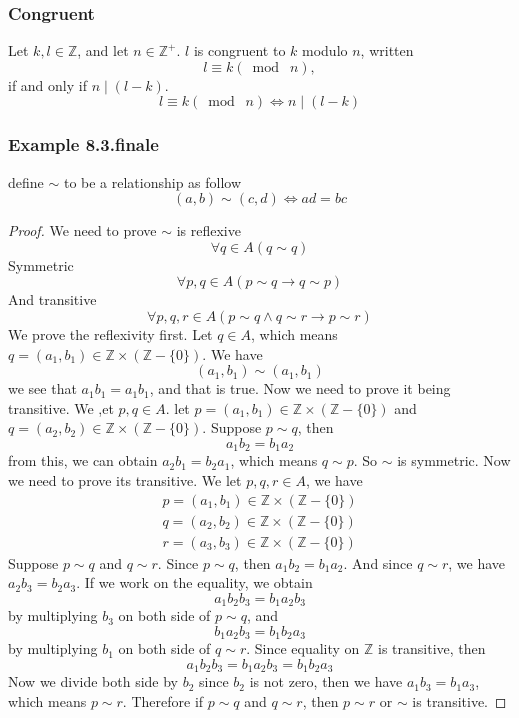 \documentclass[12pt]{book}
\newcommand{\Z}{\mathbb{Z}}
\newcommand{\paren}[1]{\left( #1 \right)}
\newcommand{\zero}{\{0\}}
\newcommand{\then}{\rightarrow}
\begin{document}
\subsubsection{Congruent}
Let $k,l \in \Z$, and let $n \in \Z^+$. $l$ is congruent to $k$ modulo $n$, written 
\[
l \equiv k (\bmod \; n),
\]
if and only if $n \mid (l-k)$.
\[
l \equiv k (\bmod \; n) \iff n \mid (l-k)
\]

\subsubsection{Example 8.3.finale}

define $\sim$ to be a relationship as follow
\[
(a,b) \sim (c,d) \iff ad=bc
\]

\begin{proof}
    We need to prove $\sim$ is reflexive
    \[
    \forall q \in A (q \sim q)
    \]
    Symmetric
    \[
    \forall p,q \in A( p \sim q \then q \sim p)
    \]
    And transitive
    \[
    \forall p,q,r \in A ( p\sim q \wedge q\sim r \then p \sim r)
    \]
    We prove the reflexivity first. Let $q \in A$, which means $q = (a_1,b_1)\in \Z \times \paren{\Z - \zero}$. We have
    \[
    (a_1,b_1) \sim (a_1,b_1)
    \]
    we see that $a_1b_1 = a_1b_1$, and that is true. Now we need to prove it being transitive. We ,et $p,q \in A$. let $p = (a_1,b_1)\in \Z \times \paren{\Z - \zero}$ and $q = (a_2,b_2)\in \Z \times \paren{\Z - \zero}$. Suppose $p \sim q$, then 
    \[
    a_1b_2 = b_1a_2
    \]
    from this, we can obtain $a_2b_1 = b_2a_1$, which means $q \sim p$. So $\sim $ is symmetric. Now we need to prove its transitive. We let $p,q,r \in A$, we have
    \begin{align*}
        p = (a_1,b_1)\in \Z \times \paren{\Z - \zero}\\
        q = (a_2,b_2)\in \Z \times \paren{\Z - \zero}\\
        r = (a_3,b_3)\in \Z \times \paren{\Z - \zero}
    \end{align*}
    Suppose $p \sim q$ and $q \sim r$. Since $p \sim q$, then $a_1b_2 = b_1a_2$. And since $q \sim r$, we have $a_2b_3 = b_2a_3$. If we work on the equality, we obtain
    \[
    a_1b_2b_3 = b_1a_2b_3
    \]
    by multiplying $b_3$ on both side of $p \sim q$, and 
    \[
    b_1a_2b_3 = b_1b_2a_3
    \]
    by multiplying $b_1$ on both side of $q \sim r$. Since equality on $\Z$ is transitive, then 
    \[
    a_1b_2b_3 = b_1a_2b_3 = b_1b_2a_3
    \]
    Now we divide both side by $b_2$ since $b_2$ is not zero, then we have $a_1b_3 = b_1a_3$, which means $p \sim r$. Therefore if $p \sim q$ and $q \sim r$, then $p \sim r$ or $\sim$ is transitive. 


    
    

    
\end{proof}
\end{document}
